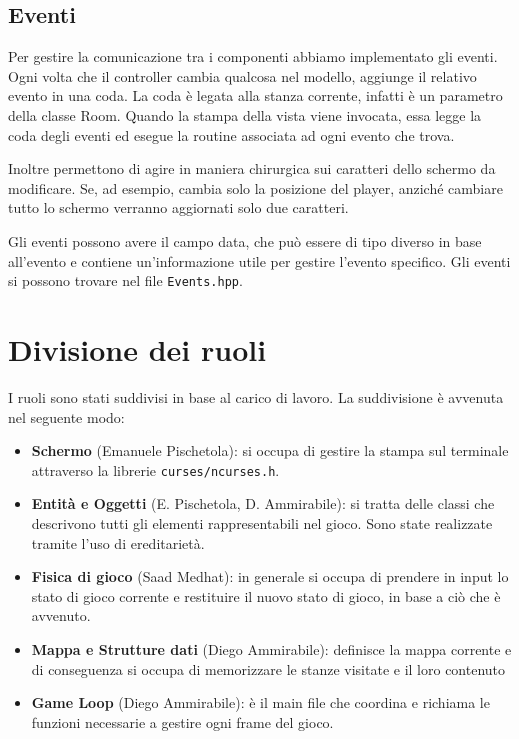\documentclass{article}
\begin{document}
\subsection{Eventi}
Per gestire la comunicazione tra i componenti abbiamo implementato gli eventi. Ogni volta che il controller cambia qualcosa nel modello, aggiunge il relativo evento in una coda. La coda è legata alla stanza corrente, infatti è un parametro della classe Room. Quando la stampa della vista viene invocata, essa legge la coda degli eventi ed esegue la routine associata ad ogni evento che trova. 

Inoltre permettono di agire in maniera chirurgica sui caratteri dello schermo da modificare. Se, ad esempio, cambia solo la posizione del player, anziché cambiare tutto lo schermo verranno aggiornati solo due caratteri.

Gli eventi possono avere il campo data, che può essere di tipo diverso in base all'evento e contiene un'informazione utile per gestire l'evento specifico.
Gli eventi si possono trovare nel file \texttt{Events.hpp}.


\section{Divisione dei ruoli}
I ruoli sono stati suddivisi in base al carico di lavoro.
La suddivisione è avvenuta nel seguente modo:
\begin{itemize}
\item \textbf{Schermo} (Emanuele Pischetola): si occupa di gestire la stampa sul terminale attraverso la librerie \texttt{curses/ncurses.h}.
\item \textbf{Entità e Oggetti} (E. Pischetola, D. Ammirabile): si tratta delle classi che descrivono tutti gli elementi rappresentabili nel gioco. Sono state realizzate tramite l'uso di ereditarietà.
\item \textbf{Fisica di gioco} (Saad Medhat): in generale si occupa di prendere in input lo stato di gioco corrente e restituire il nuovo stato di gioco, in base a ciò che è avvenuto.
\item \textbf{Mappa e Strutture dati} (Diego Ammirabile): definisce la mappa corrente e di conseguenza si occupa di memorizzare le stanze visitate e il loro contenuto
\item \textbf{Game Loop} (Diego Ammirabile): è il main file che coordina e richiama le funzioni necessarie a gestire ogni frame del gioco.
\end{itemize}
\end{document}
